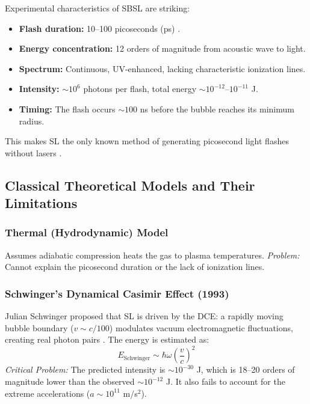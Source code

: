 \documentclass[12pt,a4paper]{article}
\begin{document}
Experimental characteristics of SBSL are striking:
\begin{itemize}
    \item \textbf{Flash duration:} 10--100 picoseconds (ps) \cite{barber1997}.
    \item \textbf{Energy concentration:} 12 orders of magnitude from acoustic wave to light.
    \item \textbf{Spectrum:} Continuous, UV-enhanced, lacking characteristic ionization lines.
    \item \textbf{Intensity:} $\sim 10^6$ photons per flash, total energy $\sim 10^{-12}$--$10^{-11}$ J.
    \item \textbf{Timing:} The flash occurs $\sim 100$ ns before the bubble reaches its minimum radius.
\end{itemize}
This makes SL the only known method of generating picosecond light flashes without lasers \cite{barber1997}.

\subsection{Classical Theoretical Models and Their Limitations}
\subsubsection{Thermal (Hydrodynamic) Model}
Assumes adiabatic compression heats the gas to plasma temperatures. \textit{Problem:} Cannot explain the picosecond duration or the lack of ionization lines.

\subsubsection{Schwinger's Dynamical Casimir Effect (1993)}
Julian Schwinger proposed that SL is driven by the DCE: a rapidly moving bubble boundary ($v \sim c/100$) modulates vacuum electromagnetic fluctuations, creating real photon pairs \cite{schwinger1993, milton2000}. The energy is estimated as:
\begin{equation}
E_{\text{Schwinger}} \sim \hbar\omega \left(\frac{v}{c}\right)^2
\end{equation}
\textit{Critical Problem:} The predicted intensity is $\sim 10^{-30}$ J, which is 18--20 orders of magnitude lower than the observed $\sim 10^{-12}$ J. It also fails to account for the extreme accelerations ($a \sim 10^{11}$ m/s$^2$).
\end{document}
